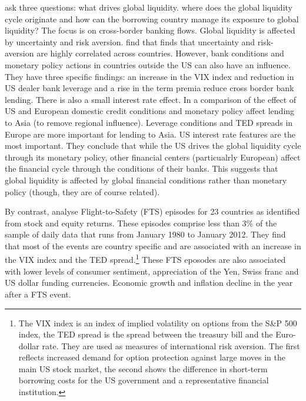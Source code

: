 \documentclass[12pt, a4paper, oneside]{article} %
\begin{document}
\citet{Cerutti2014} ask three questions:  what drives global liquidity. where does the global liquidity cycle originate and how can the borrowing country manage its exposure to global liquidity? The focus is on cross-border banking flows. Global liquidity is affected by uncertainty and risk aversion.  \citet{Cerutti2014} find that finds that uncertainty and risk-aversion are highly correlated across countries. However, bank conditions and monetary policy actions in countries outside the US can also have an influence. They have three specific findings:  an increase in the VIX index and reduction in US dealer bank leverage and a rise in the term premia reduce cross border bank lending.  There is also a small interest rate effect.  In a comparison of the effect of US and European domestic credit conditions and monetary policy affect lending to Asia (to remove regional influence).  Leverage conditions and TED spreads in Europe are more important for lending to Asia.  US interest rate features are the most important. They conclude that while the US drives the global liquidity cycle through its monetary policy, other financial centers (particualrly European) affect the financial cycle through the conditions of their banks. This suggests that global liquidity is affected by global financial conditions rather than monetary policy (though, they are of course related). 

By contrast, \citet{FTS} analyse Flight-to-Safety (FTS) episodes for 23 countries as identified from stock and equity returns.  These episodes comprise less than 3\% of the sample of daily data that runs from January 1980 to January 2012.  They find that most of the events are country specific and are associated with an increase in the VIX index and the TED spread.\footnote{The VIX index is an index of implied volatility on options from the S\&P 500 index, the TED spread is the spread between the treasury bill and the Euro-dollar rate.  They are used as measures of international risk aversion.  The first reflects increased demand for option protection against large moves in the main US stock market, the second shows the difference in short-term borrowing costs for the US government and a representative financial institution.}  These FTS eposodes are also associated with lower levels of consumer sentiment, appreciation of the  Yen, Swiss franc and US dollar funding currencies. %
Economic growth and inflation decline in the year after a FTS event. 
\end{document}
